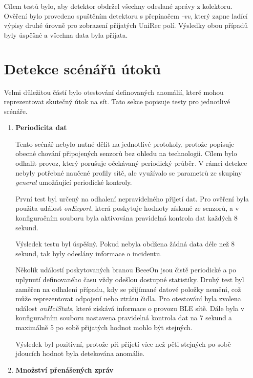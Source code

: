 Cílem testů bylo, aby detektor obdržel všechny odeslané zprávy z kolektoru. Ověření bylo provedeno
spuštěním detektoru s přepínačem \textit{-vv}, který zapne ladící výpisy druhé úrovně pro zobrazení 
přijatých UniRec polí. Výsledky obou případů byly úspěšné a všechna data byla přijata.

\section{Detekce scénářů útoků}
Velmi důležitou částí bylo otestování definovaných anomálií, které mohou reprezentovat skutečný
útok na sít. Tato sekce popisuje testy pro jednotlivé scénáře.

  \begin{enumerate}
    \item \textbf{Periodicita dat}
    
    Tento scénář nebylo nutné dělit na jednotlivé protokoly, protože popisuje obecné chování 
    připojených senzorů bez ohledu na technologii. Cílem bylo odhalit provoz, který porušuje
    očekávaný periodický průběr. V rámci detekce nebyly potřebné naučené profily sítě, 
    ale využívalo se parametrů ze skupiny \textit{general} umožňující periodické kontroly.
    
    První test byl určený na odhalení nepravidelného přijetí dat. Pro ověření byla použita událost
    \textit{onExport}, která poskytuje hodnoty získané ze senzorů, a v konfiguračním souboru byla 
    aktivována pravidelná kontrola dat každých 8 sekund.
    
    Výsledek testu byl úspěšný. Pokud nebyla obdžena žádná data déle než 8 sekund, tak byly
    odeslány informace o incidentu.
    
    Několik událostí poskytovaných branou BeeeOn jsou čistě periodické a po uplynutí definovaného
    času vždy odešlou dostupné statistiky. Druhý test byl zaměřen na odhalení případu, kdy se 
    přijímané datové položky nemění, což může reprezentovat odpojení nebo ztrátu čidla. Pro 
    otestování byla zvolena událost \textit{onHciStats}, které získává informace o provozu BLE sítě. 
    Dále byla v konfiguračním souboru nastavena pravidelná kontrola dat na 7 sekund a maximálně 
    5 po sobě přijatých hodnot mohlo být stejných. 
    
    Výsledek byl pozitivní, protože při přijetí více než pěti stejných po sobě jdoucích
    hodnot byla detekována anomálie.
    
    \item \textbf{Množství přenášených zpráv}
    

\end{enumerate}
